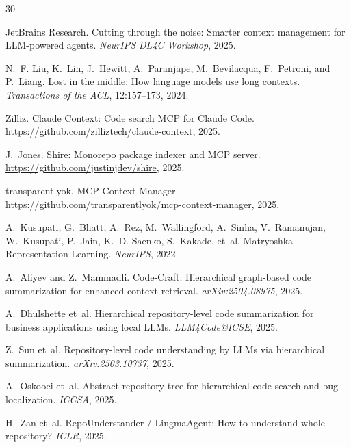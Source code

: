 \documentclass[11pt,a4paper]{article}
\begin{document}

\begin{thebibliography}{30}

JetBrains Research.
\newblock Cutting through the noise: Smarter context management for LLM-powered agents.
\newblock \emph{NeurIPS DL4C Workshop}, 2025.

N.~F. Liu, K.~Lin, J.~Hewitt, A.~Paranjape, M.~Bevilacqua, F.~Petroni, and P.~Liang.
\newblock Lost in the middle: How language models use long contexts.
\newblock \emph{Transactions of the ACL}, 12:157--173, 2024.

Zilliz.
\newblock Claude Context: Code search MCP for Claude Code.
\newblock \url{https://github.com/zilliztech/claude-context}, 2025.

J.~Jones.
\newblock Shire: Monorepo package indexer and MCP server.
\newblock \url{https://github.com/justinjdev/shire}, 2025.

transparentlyok.
\newblock MCP Context Manager.
\newblock \url{https://github.com/transparentlyok/mcp-context-manager}, 2025.

A.~Kusupati, G.~Bhatt, A.~Rez, M.~Wallingford, A.~Sinha, V.~Ramanujan, W.~Kusupati, P.~Jain, K.~D. Saenko, S.~Kakade, et~al.
\newblock Matryoshka Representation Learning.
\newblock \emph{NeurIPS}, 2022.

A.~Aliyev and Z.~Mammadli.
\newblock Code-Craft: Hierarchical graph-based code summarization for enhanced context retrieval.
\newblock \emph{arXiv:2504.08975}, 2025.

A.~Dhulshette et~al.
\newblock Hierarchical repository-level code summarization for business applications using local LLMs.
\newblock \emph{LLM4Code@ICSE}, 2025.

Z.~Sun et~al.
\newblock Repository-level code understanding by LLMs via hierarchical summarization.
\newblock \emph{arXiv:2503.10737}, 2025.

A.~Oskooei et~al.
\newblock Abstract repository tree for hierarchical code search and bug localization.
\newblock \emph{ICCSA}, 2025.

H.~Zan et~al.
\newblock RepoUnderstander / LingmaAgent: How to understand whole repository?
\newblock \emph{ICLR}, 2025.


\end{thebibliography}
\end{document}
